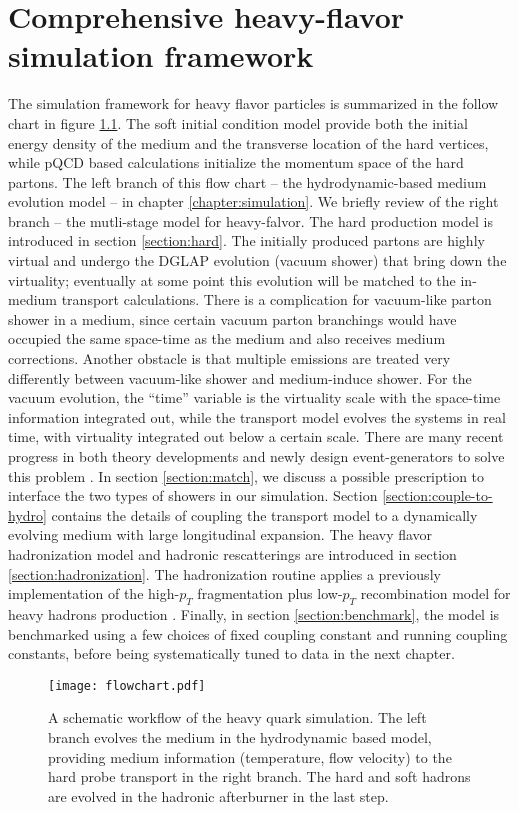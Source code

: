 \chapter{Comprehensive heavy-flavor simulation framework}
\label{chapter:coupling}
The simulation framework for heavy flavor particles is summarized in the follow chart in figure \ref{fig:flowchart}.
The soft initial condition model provide both the initial energy density of the medium and the transverse location of the hard vertices, while pQCD based calculations initialize the momentum space of the hard partons.
The left branch of this flow chart -- the hydrodynamic-based medium evolution model -- in chapter \ref{chapter:simulation}.
We briefly review of the right branch -- the mutli-stage model for heavy-falvor.
The hard production model is introduced in section \ref{section:hard}.
The initially produced partons are highly virtual and undergo the DGLAP evolution (vacuum shower) that bring down the virtuality; eventually at some point this evolution will be matched to the in-medium transport calculations.
There is a complication for vacuum-like parton shower in a medium, since  certain vacuum parton branchings would have occupied the same space-time as the medium and also receives medium corrections.
Another obstacle is that multiple emissions are treated very differently between vacuum-like shower and medium-induce shower.
For the vacuum evolution, the ``time'' variable is the virtuality scale with the space-time information integrated out, while the transport model evolves the systems in real time, with virtuality integrated out below a certain scale.
There are many recent progress in both theory developments and newly design event-generators to solve this problem \cite{MehtarTani:2012cy,Mehtar-Tani:2017ypq,Cao:2017zih,Kauder:2018cdt,Putschke:2019yrg,PhysRevLett.120.232001,Caucal:2018ofz}.
In section \ref{section:match}, we discuss a possible prescription to interface the two types of showers in our simulation.
Section \ref{section:couple-to-hydro} contains the details of coupling the transport model to a dynamically evolving medium with large longitudinal expansion.
The heavy flavor hadronization model and hadronic rescatterings are introduced in section \ref{section:hadronization}.
The hadronization routine applies a previously implementation \cite{Cao:2013ita} of the high-$p_T$ fragmentation plus low-$p_T$ recombination model for heavy hadrons production \cite{Oh:2009zj}.
Finally, in section \ref{section:benchmark}, the model is benchmarked using a few choices of fixed coupling constant and running coupling constants, before being systematically tuned to data in the next chapter.
\begin{figure}
\centering
\texttt{[image: flowchart.pdf]}
\caption{A schematic workflow of the heavy quark simulation. The left branch evolves the medium in the hydrodynamic based model, providing medium information (temperature, flow velocity) to the hard probe transport in the right branch. The hard and soft hadrons are evolved in the hadronic afterburner in the last step.}
\label{fig:flowchart}
\end{figure}

